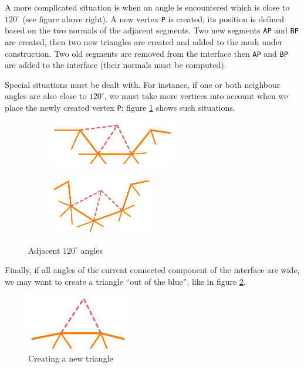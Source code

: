 A more complicated situation is when an angle is encountered which is close to $ 120^\circ $
(see figure above right).
A new vertex {\small\tt P} is created; its position is defined based on the two normals
of the adjacent segments.
Two new segments {\small\tt AP} and {\small\tt BP} are created,
then two new triangles are created and added to the mesh under construction.
Two old segments are removed from the interface then {\small\tt AP} and {\small\tt BP} are added
to the interface (their normals must be computed).

Special situations must be dealt with.
For instance, if one or both neighbour angles are also close to $ 120^\circ $,
we must take more vertices into account when we place the newly created vertex {\small\tt P};
figure \ref{\numb section 12.\numb fig 5} shows such situations.

\begin{figure}[ht] \centering
\begin{subfigure}{60mm}\centering
  \includegraphics[width=55mm]{fill-angle-120-a}
\end{subfigure}  
\begin{subfigure}{50mm}\centering
  \includegraphics[width=45mm]{fill-angle-120-b}
\end{subfigure}  
  \caption{Adjacent $ 120^\circ $ angles}
  \label{\numb section 12.\numb fig 5}
\end{figure}

Finally, if all angles of the current connected component of the interface are wide,
we may want to create a triangle ``out of the blue'', like in figure
\ref{\numb section 12.\numb fig 6}.

\begin{figure}[ht] \centering
  \includegraphics[width=45mm]{fill-blue}
  \caption{Creating a new triangle}
  \label{\numb section 12.\numb fig 6}
\end{figure}

